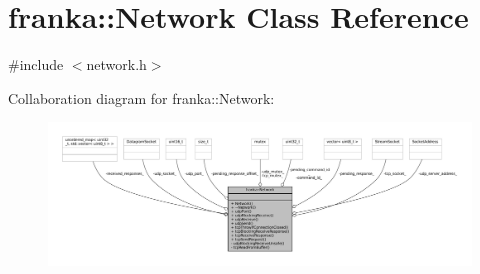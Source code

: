 \hypertarget{classfranka_1_1Network}{}\section{franka\+:\+:Network Class Reference}
\label{classfranka_1_1Network}


{\ttfamily \#include $<$network.\+h$>$}



Collaboration diagram for franka\+:\+:Network\+:
\nopagebreak
\begin{figure}[H]
\begin{center}
\leavevmode
\includegraphics[width=350pt]{classfranka_1_1Network__coll__graph}
\end{center}
\end{figure}
